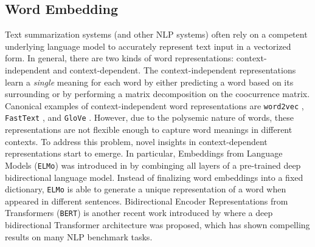 \subsection{Word Embedding}

Text summarization systems (and other NLP systems) often rely on a competent underlying language model to accurately represent text input in a vectorized form. In general, there are two kinds of word representations: context-independent and context-dependent. The context-independent representations learn a \textit{single} meaning for each word by either predicting a word based on its surrounding or by performing a matrix decomposition on the coocurrence matrix. Canonical examples of context-independent word representations are \texttt{word2vec} \cite{mikolov2013efficient}, \texttt{FastText} \cite{bojanowski2017enriching}, and \texttt{GloVe} \cite{pennington2014glove}. However, due to the polysemic nature of words, these representations are not flexible enough to capture word meanings in different contexts. To address this problem, novel insights in context-dependent representations start to emerge. In particular, Embeddings from Language Models (\texttt{ELMo}) was introduced in \cite{peters2018deep} by combinging all layers of a pre-trained deep bidirectional language model. Instead of finalizing word embeddings into a fixed dictionary, \texttt{ELMo} is able to generate a unique representation of a word when appeared in different sentences. Bidirectional Encoder Representations from Transformers (\texttt{BERT}) is another recent work introduced by \cite{devlin2018bert} where a deep bidirectional Transformer architecture was proposed, which has shown compelling results on many NLP benchmark tasks.  

